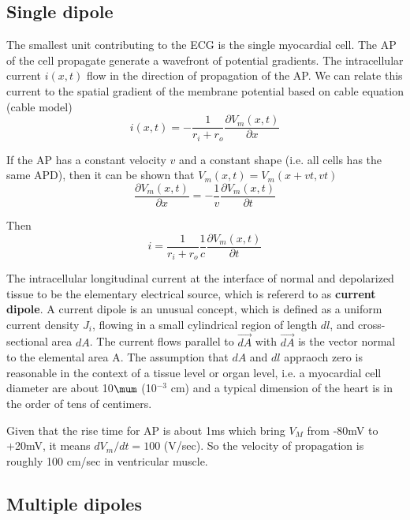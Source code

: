 \subsection{Single dipole}

The smallest unit contributing to the ECG is the single myocardial cell. The AP
of the cell propagate generate a wavefront of potential gradients. The
intracellular current $i(x,t)$ flow in the direction of propagation of the AP.
We can relate this current to the spatial gradient of the membrane potential
based on cable equation (cable model)
\begin{equation}
i(x,t) = - \frac{1}{r_i + r_o} \frac{\partial V_m(x,t)}{\partial x}
\end{equation}

If the AP has a constant velocity $v$ and a constant shape (i.e. all cells has
the same APD), then it can be shown that $V_m(x,t) = V_m(x+vt,vt)$
\begin{equation}
\frac{\partial V_m(x,t)}{\partial x} = -\frac{1}{v}\frac{\partial
V_m(x,t)}{\partial t}
\end{equation}

Then 
\begin{equation}
i = \frac{1}{r_i + r_o} \frac{1}{c} \frac{\partial V_m(x,t)}{\partial t}
\end{equation}

The intracellular longitudinal current at the interface of normal and
depolarized tissue to be the elementary electrical source, which is refererd to
as {\bf current dipole}. A current dipole is an unusual concept, which is
defined as a uniform current density $J_i$, flowing in a small cylindrical
region of length $dl$, and cross-sectional area $dA$. The current flows parallel
to $\vec{dA}$ with $\vec{dA}$ is the vector normal to the elemental area A. The
assumption that $dA$ and $dl$ appraoch zero is reasonable in the context of a
tissue level or organ level, i.e. a myocardial cell diameter are about 10$\mum$
(10$^{-3}$ cm) and a typical dimension of the heart is in the order of tens of
centimers. 

Given that the rise time for AP is about 1ms which bring $V_M$ from -80mV to
+20mV, it means $dV_m/dt = 100$ (V/sec). So the velocity of propagation is
roughly 100 cm/sec in ventricular muscle.

\subsection{Multiple dipoles}


